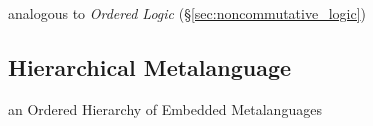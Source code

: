 analogous to \emph{Ordered Logic}
(\S\ref{sec:noncommutative_logic})



\subsection{Hierarchical Metalanguage}\label{sec:hierarchical_metalanguage}

an Ordered Hierarchy of Embedded Metalanguages
